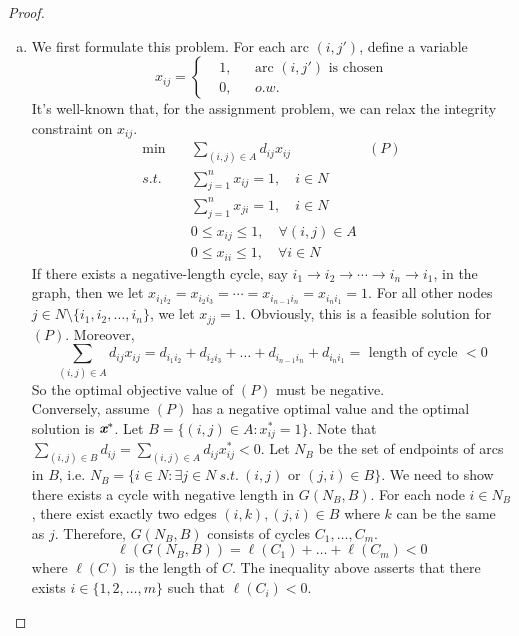 \begin{enumerate}
\begin{proof}
\begin{tcolorbox}
		 	
		\end{tcolorbox}
	\newpage
		\begin{enumerate}[(a)]
			\item We first formulate this problem. For each arc $(i,j')$, define a variable \[
			x_{ij}=\left\{
			\begin{aligned}
			&1,& &\text{arc }(i,j') \text{ is chosen}\\
			&0,& &o.w.
			\end{aligned}
			\right.
			\]
			It's well-known that, for the assignment problem, we can relax the integrity constraint on $x_{ij}$. 
			\begin{align*}
			\min \quad &\sum_{(i,j)\in A}d_{ij}x_{ij}& (P)\\
			s.t. \quad &\sum_{j=1}^n x_{ij} = 1, \quad i\in N \\
			&\sum_{j=1}^n x_{ji} = 1, \quad i\in N \\
			&0\le x_{ij}\le 1,\quad \forall (i,j)\in A\\
			&0\le x_{ii}\le 1,\quad \forall i\in N 
			\end{align*}
			If there exists a negative-length cycle, say $i_1\rightarrow i_2\rightarrow \cdots \rightarrow i_n \rightarrow i_1$, in the graph, then we let $x_{i_1i_2} = x_{i_2i_3}=\cdots = x_{i_{n-1}i_n} = x_{i_ni_1}=1$. For all other nodes $j\in N\setminus\{i_1,i_2,\ldots,i_n\}$, we let $x_{jj} =1$. Obviously, this is a feasible solution for $(P)$. Moreover,
			\[
			\sum_{(i,j)\in A} d_{ij} x_{ij} = d_{i_1i_2}+d_{i_2i_3}+\ldots+d_{i_{n-1}i_n} + d_{i_ni_1} = \text{ length of cycle }<0
			\]
			So the optimal objective value of $(P)$ must be negative. ~\\
			Conversely, assume $(P)$ has a negative optimal value and the optimal solution is $\textit{\textbf{x}}^*$. Let $B=\{(i,j)\in A: x_{ij}^*=1\}$. Note that $\sum_{(i,j)\in B} d_{ij}= \sum_{(i,j)\in A}d_{ij}x_{ij}^* <0$. Let $N_B$ be the set of endpoints of arcs in $B$, i.e. $N_B = \{i\in N: \exists j\in N ~s.t.~ (i,j) \text{ or } (j,i)\in B\}$. We need to show there exists a cycle with negative length in $G(N_B,B)$. 
			For each node $i\in N_B$, there exist exactly two edges $(i,k), (j,i)\in B$ where $k$ can be the same as $j$. Therefore, $G(N_B,B)$ consists of cycles $C_1,\ldots,C_m$.
			\[
			\ell(G(N_B,B)) = \ell(C_1)+\ldots+\ell(C_m) < 0
			\]
			where $\ell(C)$ is the length of $C$. The inequality above asserts that there exists $i\in \{1,2,\ldots,m\}$ such that $\ell(C_i)<0$.
			

\end{enumerate}
\end{proof}
\end{enumerate}
